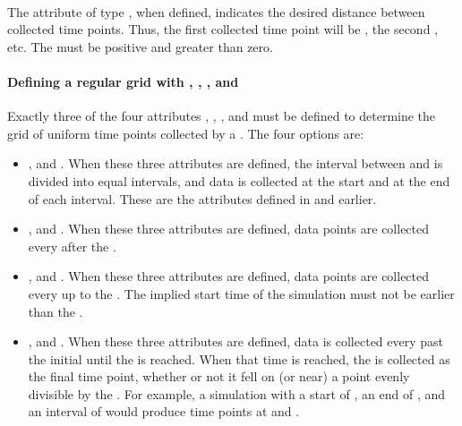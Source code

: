 \begin{blockChanged}
\paragraph*{}
\label{sec:timeInterval}
The attribute  of type , when defined, indicates the desired distance between collected time points.  Thus, the first collected time point will be , the second , etc.  The  must be positive and greater than zero.

\paragraph{Defining a regular grid with , , , and }
Exactly three of the four attributes , , , and  must be defined to determine the grid of uniform time points collected by a \UniformTimeCourse.  The four options are:

\begin{itemize} 
	\item {},  and .  When these three attributes are defined, the interval between  and  is divided into  equal intervals, and data is collected at the start and at the end of each interval.  These are the attributes defined in \LoneVfive and earlier.
    \item {},  and .  When these three attributes are defined,  data points are collected every  after the .
    \item {},  and .  When these three attributes are defined,  data points are collected every  up to the . The implied start time of the simulation must not be earlier than the .
    \item {},  and .  When these three attributes are defined, data is collected every  past the initial  until the  is reached.  When that time is reached, the  is collected as the final time point, whether or not it fell on (or near) a point evenly divisible by the .  For example, a simulation with a start of , an end of , and an interval of  would produce time points at  and .


\end{itemize}
\end{blockChanged}
